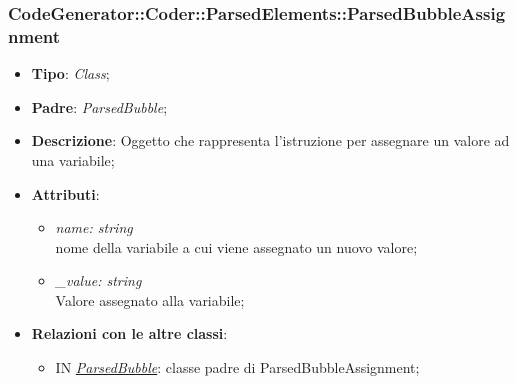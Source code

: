 \documentclass[../DefinizioneDiProdotto.tex]{subfiles}
\begin{document}
		\subsubsection{CodeGenerator::Coder::ParsedElements::ParsedBubbleAssignment}
		\hypertarget{SWEDesigner::Server::CodeGenerator::Coder::ParsedElements::ParsedBubbleAssignment}{}
		\begin{itemize}
			\item \textbf{Tipo}: \emph{Class};
			\item \textbf{Padre}: \emph{ParsedBubble};
			\item \textbf{Descrizione}: Oggetto che rappresenta l'istruzione per assegnare un valore ad una variabile;
			\item \textbf{Attributi}:
			\begin{itemize}
				\item \emph{name: string} \\
				nome della variabile a cui viene assegnato un nuovo valore;
				\item \emph{\_value: string} \\
				Valore assegnato alla variabile;
			\end{itemize}
			\item \textbf{Relazioni con le altre classi}:	
			\begin{itemize}
				\item IN \hyperlink{SWEDesigner::Server::CodeGenerator::Coder::ParsedElements::ParsedBubble}{\emph{ParsedBubble}}: classe padre di ParsedBubbleAssignment; 
			\end{itemize}
		\end{itemize}
	
\end{document}
